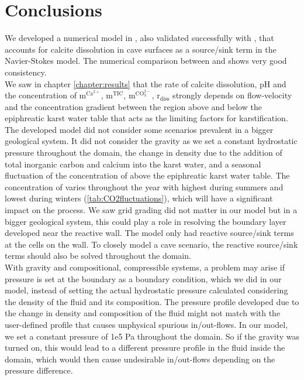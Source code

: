 \chapter{Conclusions} \label{chapter:conclusions}
\thispagestyle{empty}
We developed a numerical model in \DuMuX, also validated successfully with \MATLAB, that accounts for calcite dissolution 
in cave surfaces as a source/sink term in the Navier-Stokes model. The numerical 
comparison between \DuMuX and \MATLAB shows very good consistency.\\

We saw in chapter \ref{chapter:results} that the rate of calcite dissolution, pH and the 
concentration of $\mathrm{m^{Ca^{2+}}}$, $\mathrm{m^{TIC}}$, $\mathrm{m^{CO_3^{2-}}}$, $\mathrm{r_{diss}}$ strongly depends on 
flow-velocity and the concentration gradient between the region above and below the epiphreatic karst water table that 
acts as the limiting factors for karstification. \\

The developed model did not consider some scenarios prevalent in a bigger geological system. It did not consider the gravity 
as we set a constant hydrostatic pressure throughout the domain, the change in density due to the addition of total inorganic carbon 
and calcium into the karst water, and a seasonal fluctuation of the concentration of  above the epiphreatic karst water table. 
The concentration of  varies throughout the year with highest during summers and lowest during 
winters (\cref{tab:CO2fluctuations}), which will have a significant impact on the process. 
We saw grid grading did not matter in our model but in a bigger geological system, this could play a role in resolving the boundary layer 
developed near the reactive wall. The \DuMuX model only had reactive source/sink terms at the cells on the wall. 
To closely model a cave scenario, the reactive source/sink terms should also be solved throughout the domain. \\

With gravity and compositional, compressible systems, a problem may arise if pressure is set at the boundary as a boundary condition, 
which we did in our model, instead of setting the actual hydrostatic pressure calculated considering the density of the fluid and its composition. 
The pressure profile developed due to the change in density and composition of the fluid might not match with the 
user-defined profile that causes unphysical spurious in/out-flows. 
In our \DuMuX model, we set a constant pressure of 1e5 Pa throughout the domain. So if the gravity was turned on, this would lead to a different 
pressure profile in the fluid inside the domain, which would then cause undesirable in/out-flows depending on the pressure 
difference. \\

